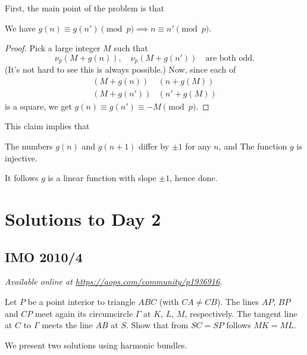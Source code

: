 \documentclass[11pt]{scrartcl}
\begin{document}
First, the main point of the problem is that
\begin{claim*}
  We have
  $g(n) \equiv g(n') \pmod p \implies n \equiv n' \pmod p$.
\end{claim*}
\begin{proof}
  Pick a large integer $M$ such that
  \[ \nu_p(M+g(n)), \quad \nu_p(M+g(n')) \quad
    \text{are both odd}. \]
  (It's not hard to see this is always possible.)
  Now, since each of
  \begin{align*}
    \left( M + g(n) \right)&\left( n + g(M)  \right) \\
    \left( M + g(n') \right)&\left( n' + g(M)  \right)
  \end{align*}
  is a square, we get $g(n) \equiv g(n') \equiv -M \pmod p$.
\end{proof}

This claim implies that
\begin{itemize}
  \ii The numbers $g(n)$ and $g(n+1)$ differ by $\pm 1$ for any $n$, and
  \ii The function $g$ is injective.
\end{itemize}
It follows $g$ is a linear function with slope $\pm 1$, hence done.
\pagebreak

\section{Solutions to Day 2}
\subsection{IMO 2010/4}
\textsl{Available online at \url{https://aops.com/community/p1936916}.}
\begin{mdframed}[style=mdpurplebox,frametitle={Problem statement}]
Let $P$ be a point interior to triangle $ABC$ (with $CA \neq CB$).
The lines $AP$, $BP$ and $CP$ meet again its circumcircle $\Gamma$
at $K$, $L$, $M$, respectively.
The tangent line at $C$ to $\Gamma$ meets the line $AB$ at $S$.
Show that from $SC = SP$ follows $MK = ML$.
\end{mdframed}
We present two solutions using harmonic bundles.
\end{document}
